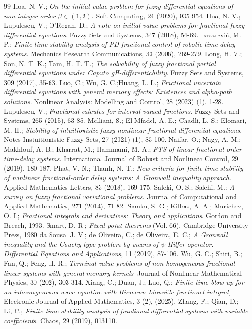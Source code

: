 \documentclass[10pt,a4paper]{amsart}
\numberwithin{equation}{section}
\begin{document}
\begin{thebibliography}{99}
 Hoa, N. V.;
\emph{On the initial value problem for fuzzy differential equations of
non-integer order $\beta \in(1,2)$}. Soft Computing, 24 (2020), 935-954.
 Hoa, N. V.; Lupulescu, V.; O'Regan, D.;
\emph{A note on initial value problems for fractional fuzzy
differential equations}. Fuzzy Sets and Systems, 347 (2018), 54-69.
 Lazarevi\'c, M. P.;
\emph{Finite time stability analysis of PD fractional control of robotic time-delay
systems}. Mechanics Research Communications, 33 (2006), 269-279.
 Long, H. V.; Son, N. T. K.; Tam, H. T. T.;
\emph{The solvability of fuzzy fractional partial differential equations
under Caputo gH-differentiability}. Fuzzy Sets and Systems, 309 (2017), 35-63.
 Luo, C.; Wu, G. C.;Huang, L. L.;
\emph{Fractional uncertain differential equations with general memory effects:
Existences and alpha-path solutions}.
Nonlinear Analysis: Modelling and Control, 28 (2023) (1), 1-28.
 Lupulescu, V.;
\emph{Fractional calculus for interval-valued functions}.
Fuzzy Sets and Systems, 265 (2015), 63-85.
 Melliani, S.; El Mfadel, A. E.; Chadli, L. S.; Elomari, M. H.;
\emph{Stability of intuitionistic fuzzy nonlinear fractional differential 
equations}. Notes Instuitionistic Fuzzy Sets, 27 (2021) (1), 83-100.
 Naifar, O.; Nagy, A. M.; Makhlouf, A. B.; Kharrat, M.;  Hammami, M. A.;
\emph{FTS of linear fractional-order time-delay systems}.
International Journal of Robust and Nonlinear Control, 29 (2019), 180-187.
 Phat, V. N.; Thanh, N. T.;
\emph{New criteria for finite-time stability of nonlinear fractional-order
delay systems: A Gronwall inequality approach}.
Applied Mathematics Letters, 83 (2018), 169-175.
 Salehi, O. S.; Salehi, M.;
\emph{A survey on fuzzy fractional variational problems}. 
Journal of Computational and Applied Mathematics, 271 (2014), 71-82.
 Samko, S. G.; Kilbas, A. A.; Marichev, O. I.;
\emph{Fractional integrals and derivatives: Theory and applications}.
Gordon and Breach, 1993.
 Smart, D. R.;
\emph{Fixed point theorems} (Vol. 66). Cambridge University Press, 1980
 da Sousa, J. V.; de Oliveira, C.; de Oliveira, E. C.;
\emph{A Gronwall inequality and the Cauchy-type problem by means of 
$\psi$-Hilfer operator}. 
\emph{Differential Equations and Applications}, 11 (2019), 87-106.
 Wu, G. C.; Shiri, B.; Fan, Q.; Feng, H. R.;
\emph{Terminal value problems of non-homogeneous fractional linear systems with 
general memory kernels}. Journal of Nonlinear Mathematical Physics, 30 (202), 303-314.
 Xiang, C.; Duan, J.; Luo, Q.;
\emph{Finite time blow-up for an inhomogeneous wave equation with Riemann-Liouville
fractional integral}, Electronic Journal of Applied Mathematics, 3 (2), (2025).
 Zhang, F.; Qian, D.; Li, C.;
\emph{Finite-time stability analysis of fractional differential systems 
with variable coefficients}. Chaos, 29 (2019), 013110.
\end{thebibliography}
\end{document}
